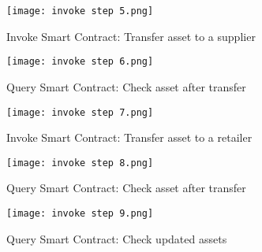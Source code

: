 \begin{figure}[H]
	\centering
	\texttt{[image: invoke step 5.png]}
	\caption{Invoke Smart Contract: Transfer asset to a supplier}
	\label{fig: fifth step}
\end{figure}

\begin{figure}[H]
	\centering
	\texttt{[image: invoke step 6.png]}
	\caption{Query Smart Contract: Check asset after transfer}
	\label{fig: sixth step}
\end{figure}

\begin{figure}[H]
	\centering
	\texttt{[image: invoke step 7.png]}
	\caption{Invoke Smart Contract: Transfer asset to a retailer }
	\label{fig: seventh step}
\end{figure}

\begin{figure}[H]
	\centering
	\texttt{[image: invoke step 8.png]}
	\caption{Query Smart Contract: Check asset after transfer}
	\label{fig: eight step}
\end{figure}

\begin{figure}[H]
	\centering
	\texttt{[image: invoke step 9.png]}
	\caption{Query Smart Contract: Check updated assets }
	\label{fig: ninth step}
\end{figure}